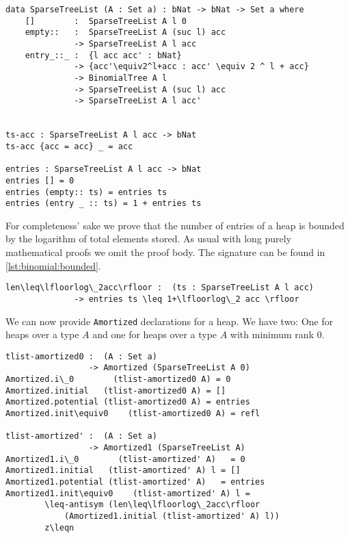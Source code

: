 \begin{lstlisting}[caption={Definition of a binomial heap},label={lst:binomial:heap},emph={SparseTreeList,empty,entry,BinomialTree,entries}]
data SparseTreeList (A : Set a) : bNat -> bNat -> Set a where
    []        :  SparseTreeList A l 0
    empty::   :  SparseTreeList A (suc l) acc
              -> SparseTreeList A l acc
    entry_::_ :  {l acc acc' : bNat}
              -> {acc'\equiv2^l+acc : acc' \equiv 2 ^ l + acc}
              -> BinomialTree A l
              -> SparseTreeList A (suc l) acc
              -> SparseTreeList A l acc'


ts-acc : SparseTreeList A l acc -> bNat
ts-acc {acc = acc} _ = acc

entries : SparseTreeList A l acc -> bNat
entries [] = 0
entries (empty:: ts) = entries ts
entries (entry _ :: ts) = 1 + entries ts
\end{lstlisting}

For completeness' sake we prove that the number of entries of a heap is bounded by the logarithm of total elements stored. As usual with long purely mathematical proofs we omit the proof body. The signature can be found in \autoref{lst:binomial:bounded}.

\begin{lstlisting}[caption={The length of a heap is bounded},label={lst:binomial:bounded},emph={SparseTreeList, entries}]
len\leq\lfloorlog\_2acc\rfloor :  (ts : SparseTreeList A l acc)
              -> entries ts \leq 1+\lfloorlog\_2 acc \rfloor
\end{lstlisting}

We can now provide \texttt{Amortized} declarations for a heap. We have two: One for heaps over a type $A$ and one for heaps over a type $A$ with minimum rank $0$.

\begin{lstlisting}[caption={Amortized declaration},label={lst:binomial:amortized},emph={tlist,amortized,Amortized}]
tlist-amortized0 :  (A : Set a)
                 -> Amortized (SparseTreeList A 0)
Amortized.i\_0        (tlist-amortized0 A) = 0
Amortized.initial   (tlist-amortized0 A) = []
Amortized.potential (tlist-amortized0 A) = entries
Amortized.init\equiv0    (tlist-amortized0 A) = refl

tlist-amortized' :  (A : Set a)
                 -> Amortized1 (SparseTreeList A)
Amortized1.i\_0        (tlist-amortized' A)   = 0
Amortized1.initial   (tlist-amortized' A) l = []
Amortized1.potential (tlist-amortized' A)   = entries
Amortized1.init\equiv0    (tlist-amortized' A) l =
        \leq-antisym (len\leq\lfloorlog\_2acc\rfloor
            (Amortized1.initial (tlist-amortized' A) l))
        z\leqn
\end{lstlisting}

